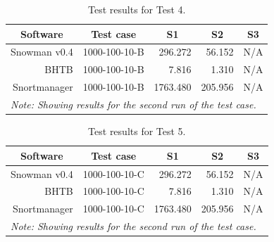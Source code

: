 \begin{table}[h]
  \centering
  \begin{tabular}{r|r|r|r|r}
  	\multicolumn{1}{c|}{Software} & \multicolumn{1}{c|}{Test case} &
  	\multicolumn{1}{c|}{S1} & \multicolumn{1}{c|}{S2} & \multicolumn{1}{c}{S3} \\
	\hline
	Snowman v0.4 & 1000-100-10-B & 296.272  & 56.152 & N/A \\
	\hline
	BHTB & 1000-100-10-B & 7.816 & 1.310 & N/A \\
	\hline
	Snortmanager & 1000-100-10-B & 1763.480 & 205.956 & N/A \\
	\hline
    \multicolumn{5}{l}{\textit{Note: Showing results for the second run of the
    test case.}}
  \end{tabular}
  \caption{Test results for Test 4.}
  \label{tab:test4Res}
\end{table}

\begin{table}[h]
  \centering
  \begin{tabular}{r|r|r|r|r}
  	\multicolumn{1}{c|}{Software} & \multicolumn{1}{c|}{Test case} &
  	\multicolumn{1}{c|}{S1} & \multicolumn{1}{c|}{S2} & \multicolumn{1}{c}{S3} \\
	\hline
	Snowman v0.4 & 1000-100-10-C & 296.272  & 56.152 & N/A \\
	\hline
	BHTB & 1000-100-10-C & 7.816 & 1.310 & N/A \\
	\hline
	Snortmanager & 1000-100-10-C & 1763.480 & 205.956 & N/A \\
	\hline
    \multicolumn{5}{l}{\textit{Note: Showing results for the second run of the
    test case.}}
  \end{tabular}
  \caption{Test results for Test 5.}
  \label{tab:test5Res}
\end{table}


